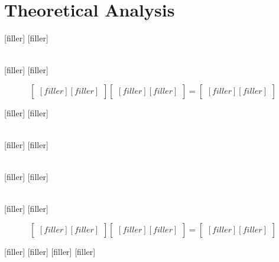 \section{Theoretical Analysis}
\label{sec:analysis}



[filler]
[filler]



\begin{align*} 
[filler]
[filler]
[filler]
\end{align*}


[filler]
[filler]


$$
\begin{bmatrix} 
[filler]
[filler]
\end {bmatrix} 
\begin{bmatrix} 
[filler]
[filler]
\end {bmatrix} 
=
\begin{bmatrix} 
[filler]
[filler]
\end {bmatrix} 
$$


[filler]
[filler]

\begin{align*} 
[filler]
[filler]
\end{align*}

 

[filler]
[filler]



\begin{align*} 
[filler]
[filler]
\end{align*}

[filler]
[filler]

\begin{align*} 
[filler]
[filler]
\end{align*}

[filler]
[filler]


$$
\begin{bmatrix} 
[filler]
[filler]
\end {bmatrix} 
\begin{bmatrix}
[filler]
[filler]
\end{bmatrix}
=
\begin{bmatrix}
[filler]
[filler]
\end{bmatrix}
$$


[filler]
[filler]
[filler]
[filler]


%    

%   
